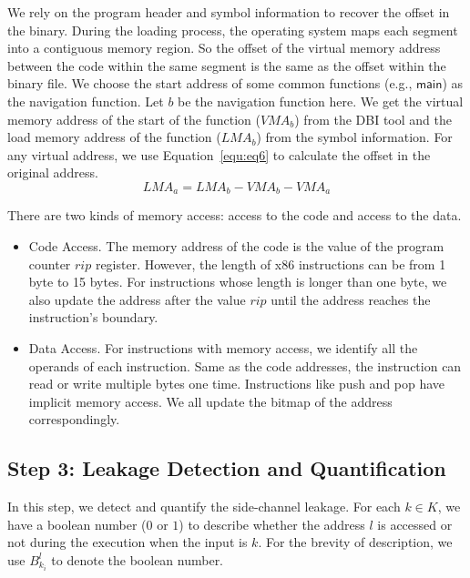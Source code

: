 We rely on the program header and symbol information to recover the
offset in the binary. During the loading process, the operating system
maps each segment into a contiguous memory region. So the offset of
the virtual memory address between the code within the same segment is
the same as the offset within the binary file. We choose the start
address of some common functions (e.g., $\textsf{main}$) as the navigation
function. Let $b$ be the navigation function here. 
We get the virtual memory address of the start of the
function ($\mathit{VMA}_b$) from the DBI tool and the load memory
address of the function ($\mathit{LMA}_b$) from the symbol
information. For any virtual address, we use Equation~\ref{equ:eq6} to
calculate the offset in the original address.
\begin{equation}\label{equ:eq6}
    \mathit{LMA}_a = \mathit{LMA}_b - \mathit{VMA}_b - \mathit{VMA}_a
\end{equation}

There are two kinds of memory access: access to the code and access to the data. 
\begin{itemize}
\item Code Access. The memory address of the code is the value of the program counter $\mathit{rip}$ register. However, the length of x86 instructions can be from 1 byte to 15 bytes. For instructions whose length is longer than one byte, we also update the address after the value $\mathit{rip}$ until the address reaches the instruction's boundary.
\item Data Access. For instructions with memory access, we identify all the operands of each instruction. Same as the code addresses, the instruction can read or write multiple bytes one time.  Instructions like \textsf{push} and \textsf{pop} have implicit memory access. We all update the bitmap of the address correspondingly.
\end{itemize}

\subsection{Step 3: Leakage Detection and Quantification}
In this step, we detect and quantify the side-channel leakage. For each $k \in K$, we have a boolean number ($0$ or $1$) to describe whether the address $l$ is accessed or not during the execution when the input is $k$. For the brevity of description, we use $B^{l}_{k_i}$ to denote the boolean number. 


